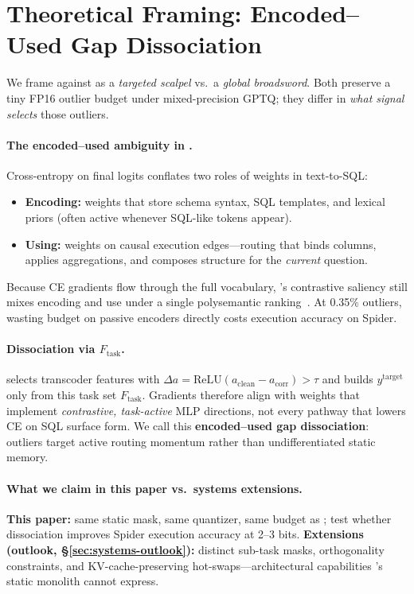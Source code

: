 \section{Theoretical Framing: Encoded--Used Gap Dissociation}
\label{sec:encoded-used}

We frame \method{} against \baseline{} as a \emph{targeted scalpel} vs.\ a \emph{global broadsword}.
Both preserve a tiny FP16 outlier budget under mixed-precision GPTQ; they differ in \emph{what signal
selects} those outliers.

\paragraph{The encoded--used ambiguity in \baseline{}.}
Cross-entropy on final logits conflates two roles of weights in text-to-SQL:
\begin{itemize}
  \item \textbf{Encoding:} weights that store schema syntax, SQL templates, and lexical priors
        (often active whenever SQL-like tokens appear).
  \item \textbf{Using:} weights on causal execution edges---routing that binds columns, applies
        aggregations, and composes structure for the \emph{current} question.
\end{itemize}
Because CE gradients flow through the full vocabulary, \baseline{}'s contrastive saliency still
 mixes encoding and use under a single polysemantic ranking~\citep{xiao2025tacq}.
At 0.35\% outliers, wasting budget on passive encoders directly costs execution accuracy on Spider.

\paragraph{Dissociation via $F_{\text{task}}$.}
\method{} selects transcoder features with $\Delta a = \mathrm{ReLU}(a_{\text{clean}} - a_{\text{corr}}) > \tau$
and builds $y^{\text{target}}$ only from this task set $F_{\text{task}}$.
Gradients therefore align with weights that implement \emph{contrastive, task-active} MLP directions,
not every pathway that lowers CE on SQL surface form.
We call this \textbf{encoded--used gap dissociation}: outliers target active routing momentum rather
than undifferentiated static memory.

\paragraph{What we claim in this paper vs.\ systems extensions.}
\textbf{This paper:} same static mask, same quantizer, same budget as \baseline{}; test whether
dissociation improves Spider execution accuracy at 2--3 bits.
\textbf{Extensions (outlook, \S\ref{sec:systems-outlook}):} distinct sub-task masks, orthogonality
constraints, and KV-cache-preserving hot-swaps---architectural capabilities \baseline{}'s static
monolith cannot express.
